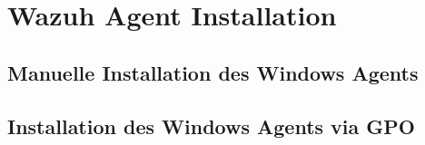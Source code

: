 \chapter{Wazuh Agent Installation}

\section{Manuelle Installation des Windows Agents}
\section{Installation des Windows Agents via GPO}

%
%
%
%
%
%









